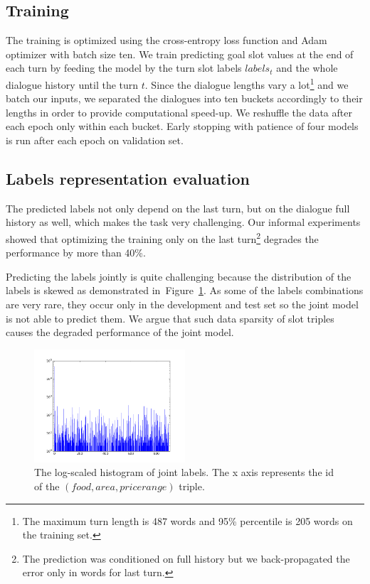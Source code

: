 \documentclass{itatnew}
\begin{document}
\subsection{Training}
\label{sec:train}
The training is optimized using the cross-entropy loss function and Adam optimizer\cite{kingma2014adam} with batch size ten.
We train predicting goal slot values at the end of each turn by feeding the model by the turn slot labels $labels_t$ and the whole dialogue history until the turn $t$.
Since the dialogue lengths vary a lot\footnote{The maximum turn length is 487 words and 95\% percentile is 205 words on the training set.} and we batch our inputs, we separated the dialogues into ten buckets accordingly to their lengths in order to provide computational speed-up. We reshuffle the data after each epoch only within each bucket.
Early stopping with patience\cite{prechelt1998early} of four models is run after each epoch on validation set.

\subsection{Labels representation evaluation}
\label{sec:eval}
The predicted labels not only depend on the last turn, but on the dialogue full history as well, which makes the task very challenging.
Our informal experiments showed that optimizing the training only on the last turn\footnote{The prediction was conditioned on full history but we back-propagated the error only in words for last turn.} degrades the performance by more than 40\%.

Predicting the labels jointly is quite challenging because the distribution of the labels is skewed as demonstrated in~Figure~\ref{fig:labels}.
As some of the labels combinations are very rare, they occur only in the development and test set so the joint model is not able to predict them.
We argue that such data sparsity of slot triples causes the degraded performance of the joint model.

\begin{figure}
\includegraphics[width=0.5\textwidth]{dstc2_goals_joint_log_scale}
\caption{The log-scaled histogram of joint labels. The x axis represents the id of the $(food, area, pricerange)$ triple.}
\label{fig:labels}
\end{figure}
\end{document}
